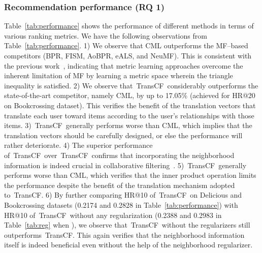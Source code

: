 \documentclass[conference]{IEEEtran}
\newcommand{\propose}{\textsf{{TransCF}}}
\newcommand{\proposealt}{\propose}
\newcommand{\proposedot}{\propose}
\begin{document}
\subsubsection{\textbf{Recommendation performance (RQ 1)}}
Table~\ref{tab:performance} shows the performance of different methods in terms of various ranking metrics.
We have the following observations from Table~\ref{tab:performance}. 1) We observe that CML outperforms the MF--based competitors (BPR, FISM, AoBPR, eALS, and NeuMF). This is consistent with the previous work~\cite{hsieh2017collaborative}, indicating that metric learning approaches overcome the inherent limitation of MF by learning a metric space wherein the triangle inequality is satisfied.
2) We observe that~\propose~considerably outperforms the state-of-the-art competitor, namely CML, by up to 17.05\% (achieved for HR@20 on Bookcrossing dataset). 
This verifies the benefit of the translation vectors that translate each user toward items according to the user's relationships with those items. 
3)~\proposealt~generally performs worse than CML, which implies that the translation vectors should be carefully designed, or else the performance will rather deteriorate.
4) The superior performance of~\propose~over~\proposealt~confirms that incorporating the neighborhood information is indeed crucial in collaborative filtering~\cite{koren2008factorization,kabbur2013fism,wu2016collaborative}. 
5)~\proposedot~generally performs worse than CML, which verifies that the inner product operation limits the performance despite the benefit of the translation mechanism adopted to~\proposedot.
6) By further comparing HR@10 of~\proposealt~on Delicious and Bookcrossing datasets (0.2174 and 0.2828 in Table~\ref{tab:performance}) with HR@10 of~\propose~without any regularization (0.2388 and 0.2983 in Table~\ref{tab:reg} when ), we observe that~\propose~without the regularizers still outperforms~\proposealt. This again verifies that the neighborhood information itself is indeed beneficial even without the help of the neighborhood regularizer. 
\end{document}
